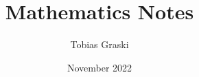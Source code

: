 \documentclass{article}
\title{Mathematics Notes}
\date{November 2022}
\author{Tobias Graski}
\newcounter{RPages}
\begin{document}
\begin{titlepage}
    \maketitle
    \thispagestyle{empty}
\end{titlepage}
\renewcommand{\lstlistlistingname}{source directory}


\tableofcontents
\newpage
\setcounter{RPages}{\value{page}}
\setcounter{page}{0}

\end{document}
